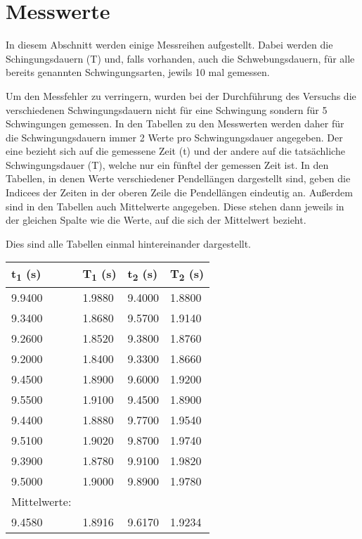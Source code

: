 \documentclass[titlepage=firstcover, captions=tableheading]{scrartcl}
\begin{document}
\section{Messwerte}
In diesem Abschnitt werden einige Messreihen aufgestellt.
Dabei werden die Schingungsdauern (T) und, falls vorhanden, auch die Schwebungsdauern, für alle bereits genannten Schwingungsarten,
jewils 10 mal gemessen.

\noindent Um den Messfehler zu verringern, wurden bei der Durchführung des Versuchs die verschiedenen Schwingungsdauern
nicht für eine Schwingung sondern für 5 Schwingungen gemessen. In den Tabellen zu den Messwerten werden daher für die Schwingungsdauern
immer 2 Werte pro Schwingungsdauer angegeben. Der eine bezieht sich auf die gemessene Zeit (t) und 
der andere auf die tatsächliche Schwingungsdauer (T), welche nur ein fünftel der gemessen Zeit ist.
In den Tabellen, in denen Werte verschiedener Pendellängen dargestellt sind, geben die Indicees der Zeiten in der oberen Zeile die Pendellängen eindeutig an.
Außerdem sind in den Tabellen auch Mittelwerte angegeben. Diese stehen dann jeweils in der gleichen Spalte wie die Werte, auf die sich der Mittelwert bezieht.

\noindent Dies sind alle Tabellen einmal hintereinander dargestellt.



    \begin{minipage}{\linewidth}
        \centering
    \begin{tabular}{llll}
        \toprule
        t\textsubscript{1} (s) & T\textsubscript{1} (s) & t\textsubscript{2} (s) & T\textsubscript{2} (s) \\
        \midrule
        9.9400  &    1.9880  & 9.4000 & 1.8800 \\
        9.3400  &    1.8680  & 9.5700 & 1.9140 \\
        9.2600  &    1.8520  & 9.3800 & 1.8760 \\
        9.2000  &    1.8400  & 9.3300 & 1.8660 \\
        9.4500  &    1.8900  & 9.6000 & 1.9200 \\
        9.5500  &    1.9100  & 9.4500 & 1.8900 \\
        9.4400  &    1.8880  & 9.7700 & 1.9540 \\
        9.5100  &    1.9020  & 9.8700 & 1.9740 \\
        9.3900  &    1.8780  & 9.9100 & 1.9820 \\
        9.5000  &    1.9000  & 9.8900 & 1.9780 \\
        \midrule
        Mittelwerte:\\
        9.4580 & 1.8916 & 9.6170 & 1.9234  \\
        \bottomrule
        
    \end{tabular}
\end{minipage}
\end{document}
